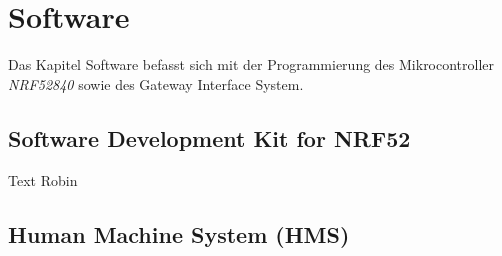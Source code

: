 \clearpage
\section{Software}\label{sec:Software}
Das Kapitel Software befasst sich mit der Programmierung des Mikrocontroller \textit{NRF52840} sowie des Gateway Interface System.

\subsection{Software Development Kit for NRF52}\label{subsec:SDK}
Text Robin

\subsection{Human Machine System (HMS)}\label{subsec:HMS_SW}